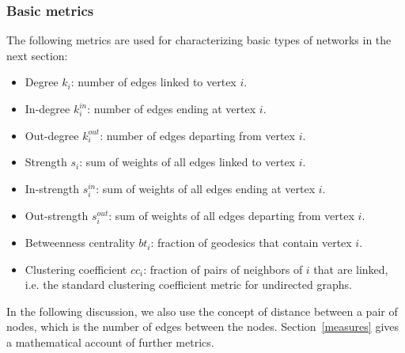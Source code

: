 \subsubsection{Basic metrics}\label{se:intMea}
The following metrics are used for characterizing basic types
of networks in the next section:
\begin{itemize}
\item Degree $k_i$: number of edges linked to vertex $i$.
\item In-degree $k_i^{in}$: number of edges ending at vertex $i$.
\item Out-degree $k_i^{out}$: number of edges departing from vertex $i$.
\item Strength $s_i$: sum of weights of all edges linked to vertex $i$.
\item In-strength $s_i^{in}$: sum of weights of all edges ending at vertex $i$.
\item Out-strength $s_i^{out}$: sum of weights of all edges departing from vertex $i$.
\item Betweenness centrality $bt_i$: fraction of geodesics that contain vertex $i$.
\item Clustering coefficient $cc_i$: fraction of pairs of neighbors of $i$ that are linked, i.e. the standard clustering coefficient metric for undirected graphs.
\end{itemize}
In the following discussion, we also use the concept of distance between a pair of nodes,
which is the number of edges between the nodes.
Section~\ref{measures} gives a mathematical account of further metrics.

